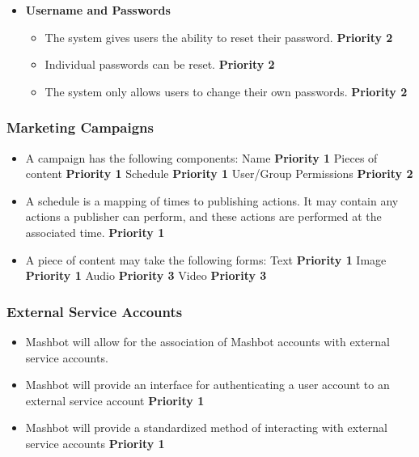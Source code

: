\documentclass{report}
\begin{document}
\begin{itemize}
\begin{itemize}
\item \textbf{Username and Passwords}
  \begin{itemize}
  \item The system gives users the ability to reset their password. \textbf{Priority 2}
  \item Individual passwords can be reset. \textbf{Priority 2}
  \item The system only allows users to change their own passwords. \textbf{Priority 2}
  \end{itemize}
\end{itemize}

\end{itemize}
\subsubsection{Marketing Campaigns} %
\begin{itemize}

\item A campaign has the following components:
\subitem Name \textbf{Priority 1}
\subitem Pieces of content \textbf{Priority 1}
\subitem Schedule \textbf{Priority 1}
\subitem User/Group Permissions \textbf{Priority 2}

\item A schedule is a mapping of times to publishing actions. It may
  contain any actions a publisher can perform, and these actions are
  performed at the associated time. \textbf{Priority 1}

\item A piece of content may take the following forms:
\subitem Text \textbf{Priority 1}
\subitem Image \textbf{Priority 1}
\subitem Audio \textbf{Priority 3}
\subitem Video \textbf{Priority 3}
\end{itemize}

\subsubsection{External Service Accounts} %

\begin{itemize}
\item Mashbot will allow for the association of Mashbot accounts with
  external service accounts.

\item Mashbot will provide an interface for authenticating a user
  account to an external service account \textbf{Priority 1}
\item Mashbot will provide a standardized method of interacting with
  external service accounts \textbf{Priority 1}
\end{itemize}
\end{document}
